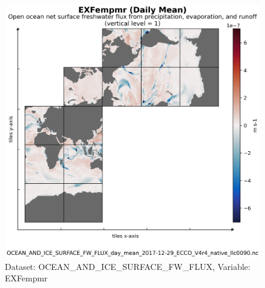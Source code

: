 \begin{figure}[H]
\centering
\includegraphics[scale=0.55]{../images/plots/native_plots/Ocean_and_Sea-Ice_Surface_Freshwater_Fluxes/EXFempmr.png}
\caption{Dataset: OCEAN\_AND\_ICE\_SURFACE\_FW\_FLUX, Variable: EXFempmr}
\label{tab:table-OCEAN_AND_ICE_SURFACE_FW_FLUX_EXFempmr-Plot}
\end{figure}
\newpage
\pagebreak
